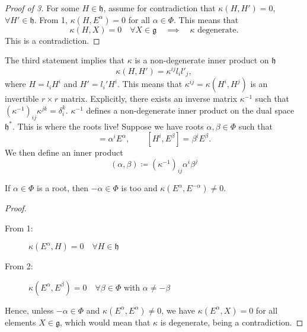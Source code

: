 \begin{proof}[Proof of 3]
  For some $H \in \mathfrak{h}$, assume for contradiction that $\kappa(H, H') = 0$, $\forall H' \in \mathfrak{h}$. From 1, $\kappa(H, E^{\alpha}) = 0$ for all $\alpha \in \Phi$. This means that
  \begin{equation}
    \kappa(H, X) = 0 \quad \forall X \in \mathfrak{g} \quad \implies \quad \kappa \text{ degenerate}.
  \end{equation}
  This is a contradiction.
\end{proof}
The third statement implies that $\kappa$ is a non-degenerate inner product on $\mathfrak{h}$
\begin{equation}
  \kappa(H, H') = \kappa^{ij} l_{i} l'_{j},
\end{equation}
where $H = l_{i} H^{i}$ and $H' = l_{i}' H^{i}$.
This means that $\kappa^{ij} = \kappa(H^{i}, H^{j})$ is an invertible $r \times r$ matrix. Explicitly, there exists an inverse matrix $\kappa^{-1}$ such that $(\kappa^{-1})_{ij} \kappa^{jk} = \delta^{k}_{i}$.
$\kappa^{-1}$ defines a non-degenerate inner product on the dual space $\mathfrak{h}^*$.
This is where the roots live! Suppose we have roots $\alpha, \beta \in \Phi$ such that
\begin{equation}
  [H^{i}, E^{\alpha}] = \alpha^{i} E^{\alpha}, \qquad [H^{i}, E^{\beta}] = \beta^{i} E^{\beta}.
\end{equation}
We then define an inner product
\begin{equation}
  \label{eq:16-6}
  \boxed{(\alpha, \beta) \coloneqq (\kappa^{-1})_{ij} \alpha^{i} \beta^{j}}
\end{equation}
\begin{claim} \label{claim:16-inverse-root-is-root}
  If $\alpha \in \Phi$ is a root, then $-\alpha \in \Phi$ is too and $\kappa(E^{\alpha}, E^{-\alpha}) \neq 0$.
\end{claim}
\begin{proof}
  \begin{description}
    \item[From 1:] $\kappa(E^{\alpha}, H) = 0 \quad \forall H \in \mathfrak{h}$
    \item[From 2:] $\kappa(E^{\alpha}, E^{\beta}) = 0 \quad \forall \beta \in \Phi$ with $\alpha \neq -\beta$
  \end{description}
  Hence, unless $-\alpha \in \Phi$ and $\kappa(E^{\alpha}, E^{\alpha}) \neq 0$, we have $\kappa(E^{\alpha}, X) = 0$ for all elements $X \in \mathfrak{g}$, which would mean that $\kappa$ is degenerate, being a contradiction.
\end{proof}

